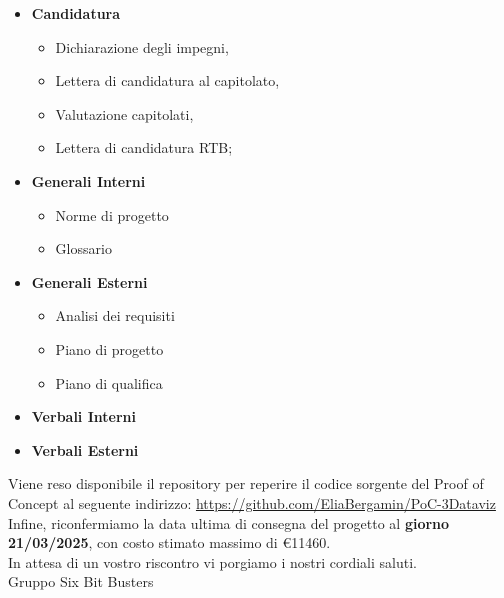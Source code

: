 \begin{titlepage}
        \begin{itemize}
                \item \textbf{Candidatura}
                \begin{itemize}
                        \item Dichiarazione degli impegni,
                        \item Lettera di candidatura al capitolato,
                        \item Valutazione capitolati,
                        \item Lettera di candidatura RTB;
                \end{itemize}
                \item \textbf{Generali Interni}
                \begin{itemize}
                        \item Norme di progetto
                        \item Glossario
                \end{itemize}
                \item \textbf{Generali Esterni}
                \begin{itemize}
                        \item Analisi dei requisiti
                        \item Piano di progetto
                        \item Piano di qualifica
                \end{itemize}
                \item \textbf{Verbali Interni}
                \item \textbf{Verbali Esterni}
        \end{itemize}

        Viene reso disponibile il repository per reperire il codice sorgente del Proof of Concept al seguente indirizzo: 
        \url{https://github.com/EliaBergamin/PoC-3Dataviz}\\

        Infine, riconfermiamo la data ultima di consegna del progetto al \textbf{giorno 21/03/2025}, con costo
        stimato massimo di \euro{11460}.\\
	
	In attesa di un vostro riscontro vi porgiamo i nostri cordiali saluti.\\
        Gruppo Six Bit Busters
	
\end{titlepage}
